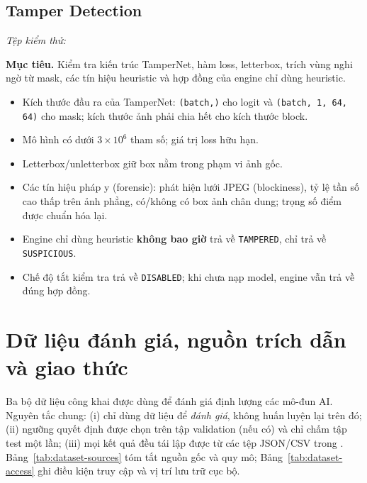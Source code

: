 \documentclass[12pt,a4paper]{article}
\begin{document}
\subsection{Tamper Detection}
\textit{Tệp kiểm thử:} 

\textbf{Mục tiêu.} Kiểm tra kiến trúc TamperNet, hàm loss, letterbox, trích vùng nghi ngờ từ mask, các tín hiệu
heuristic và hợp đồng của engine chỉ dùng heuristic.

\begin{itemize}
  \item Kích thước đầu ra của TamperNet: \texttt{(batch,)} cho logit và \texttt{(batch, 1, 64, 64)} cho mask;
        kích thước ảnh phải chia hết cho kích thước block.
  \item Mô hình có dưới $3\times 10^{6}$ tham số; giá trị loss hữu hạn.
  \item Letterbox/unletterbox giữ box nằm trong phạm vi ảnh gốc.
  \item Các tín hiệu pháp y (forensic): phát hiện lưới JPEG (blockiness), tỷ lệ tần số cao thấp trên ảnh phẳng,
        có/không có box ảnh chân dung; trọng số điểm được chuẩn hóa lại.
  \item Engine chỉ dùng heuristic \textbf{không bao giờ} trả về \texttt{TAMPERED}, chỉ trả về \texttt{SUSPICIOUS}.
  \item Chế độ tắt kiểm tra trả về \texttt{DISABLED}; khi chưa nạp model, engine vẫn trả về đúng hợp đồng.
\end{itemize}

\section{Dữ liệu đánh giá, nguồn trích dẫn và giao thức}\label{sec:datasets}
Ba bộ dữ liệu công khai được dùng để đánh giá định lượng các mô-đun AI. Nguyên tắc chung:
(i) chỉ dùng dữ liệu để \emph{đánh giá}, không huấn luyện lại trên đó;
(ii) ngưỡng quyết định được chọn trên tập validation (nếu có) và chỉ chấm tập test một lần;
(iii) mọi kết quả đều tái lập được từ các tệp JSON/CSV trong .
Bảng~\ref{tab:dataset-sources} tóm tắt nguồn gốc và quy mô; Bảng~\ref{tab:dataset-access} ghi
điều kiện truy cập và vị trí lưu trữ cục bộ.
\end{document}
